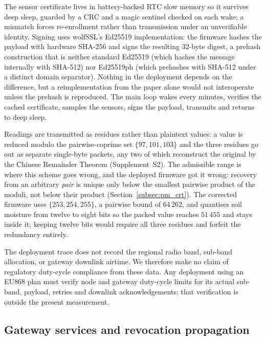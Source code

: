 \documentclass[a4paper,fleqn]{cas-sc}
\begin{document}
The sensor certificate lives in battery-backed RTC slow memory so it
survives deep sleep, guarded by a CRC and a magic sentinel checked on each
wake; a mismatch forces re-enrollment rather than transmission under an
unverifiable identity. Signing uses wolfSSL's Ed25519 implementation: the
firmware hashes the payload with hardware SHA-256 and signs the resulting
32-byte digest, a prehash construction that is neither standard Ed25519
(which hashes the message internally with SHA-512) nor Ed25519ph (which
prehashes with SHA-512 under a distinct domain separator). Nothing in the
deployment depends on the difference, but a reimplementation from the
paper alone would not interoperate unless the prehash is reproduced. The
main loop wakes every \DutyCycleMinutes{} minutes, verifies the cached
certificate, samples the sensors, signs the payload, transmits and returns
to deep sleep.

Readings are transmitted as residues rather than plaintext values: a value
is reduced modulo the pairwise-coprime set $\{97, 101, 103\}$ and the three
residues go out as separate single-byte packets, any two of which
reconstruct the original by the Chinese Remainder Theorem
\cite{garner1959residue} (Supplement~S2). The admissible range is where
this scheme goes wrong, and the deployed firmware got it wrong: recovery
from an arbitrary \emph{pair} is unique only below the smallest pairwise
product of the moduli, not below their product (Section~\ref{subsec:pm_crt}).
The corrected firmware uses $\{253, 254, 255\}$, a pairwise bound of
$64\,262$, and quantises soil moisture from twelve to eight bits so the
packed value reaches $51\,455$ and stays inside it; keeping twelve bits
would require all three residues and forfeit the redundancy entirely.

The deployment trace does not record the regional radio band, sub-band
allocation, or gateway downlink airtime. We therefore make no claim of
regulatory duty-cycle compliance from these data. Any deployment using an
EU868 plan must verify node and gateway duty-cycle limits for its actual
sub-band, payload, retries and downlink acknowledgements; that verification
is outside the present measurement.

\subsection{Gateway services and revocation propagation}
\label{subsec:gateway}
\end{document}

